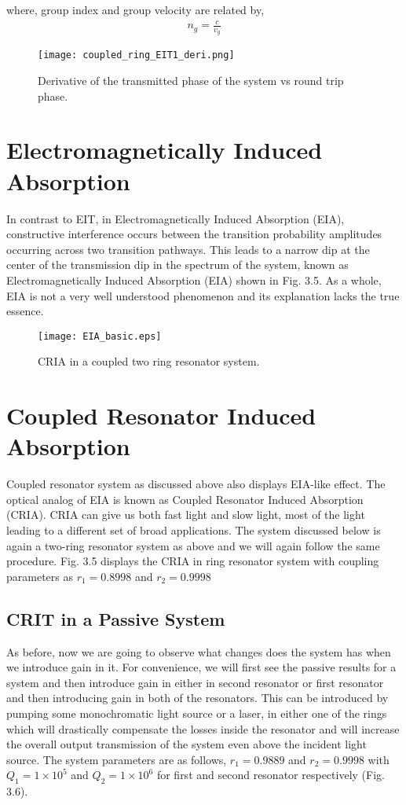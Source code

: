 where, group index and group velocity are related by, 
\begin{align*}
n_{g} = \frac{c}{v_{g}}
\end{align*}

\begin{figure}[h]
\centering
\texttt{[image: coupled\_ring\_EIT1\_deri.png]}
\caption{Derivative of the transmitted phase of the system vs round trip phase.}
\end{figure}

\section{Electromagnetically Induced Absorption}
In contrast to EIT, in Electromagnetically Induced Absorption (EIA), constructive interference occurs between the transition probability amplitudes occurring across two transition pathways. This leads to a narrow dip at the center of the transmission dip in the spectrum of the system, known as Electromagnetically Induced Absorption (EIA) shown in Fig. 3.5. As a whole, EIA is not a very well understood phenomenon and its explanation lacks the true essence.

\begin{figure}[h]
\centering
\texttt{[image: EIA\_basic.eps]}
\caption{CRIA in a coupled two ring resonator system.}
\end{figure}

\section{Coupled Resonator Induced Absorption} 
 
Coupled resonator system as discussed above also displays EIA-like effect. The optical analog of EIA is known as Coupled Resonator Induced Absorption (CRIA). CRIA can give us both fast light and slow light, most of the light leading to a different set of broad applications. The system discussed below is again a two-ring resonator system as above and we will again follow the same procedure. Fig. 3.5 displays the CRIA in ring resonator system with coupling parameters as $r_{1} = 0.8998$ and $r_{2} = 0.9998$


\subsection{CRIT in a Passive System}
As before, now we are going to observe what changes does the system has when we introduce gain in it. For convenience, we will first see the passive results for a system and then introduce gain in either in second resonator or first resonator and then introducing gain in both of the resonators. This can be introduced by pumping some monochromatic light source or a laser, in either one of the rings which will drastically compensate the losses inside the resonator and will increase the overall output transmission of the system even above the incident light source. The system parameters are as follows, $r_{1} = 0.9889$ and $r_{2} = 0.9998$ with $Q_{1} = 1\times10^{5}$ and $Q_{2} = 1\times10^{6}$ for first and second resonator respectively (Fig. 3.6). 

